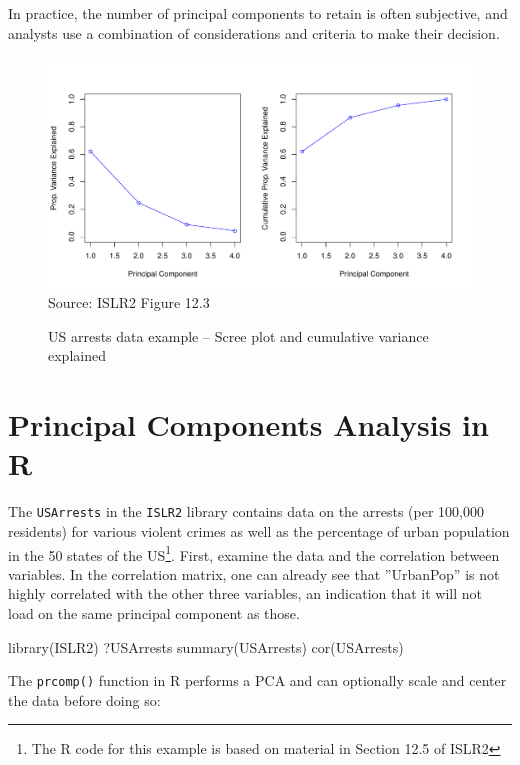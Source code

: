 In practice, the number of principal components to retain is often subjective, and analysts use a combination of considerations and criteria to make their decision.

\begin{figure}
\centering
\includegraphics[width=.9\textwidth]{../class11/Figures_Chapters_7-13/Chapter12/12_3.pdf} \\

\scriptsize Source: ISLR2 Figure 12.3
\caption[US arrests data example -- Scree plot]{US arrests data example -- Scree plot and cumulative variance explained}
\label{fig:pca3}
\end{figure}

\section{Principal Components Analysis in R}

The \texttt{USArrests} in the \texttt{ISLR2} library contains data on the arrests (per 100,000 residents) for various violent crimes as well as the percentage of urban population in the 50 states of the US\footnote{The R code for this example is based on material in Section 12.5 of ISLR2}. First, examine the data and the correlation between variables. In the correlation matrix, one can already see that ''UrbanPop'' is not highly correlated with the other three variables, an indication that it will not load on the same principal component as those.

\begin{samepage}
\begin{Rcode}
library(ISLR2)
?USArrests
summary(USArrests)
cor(USArrests)
\end{Rcode}
\end{samepage}

\noindent The \texttt{prcomp()} function in R performs a PCA and can optionally scale and center the data before doing so:


